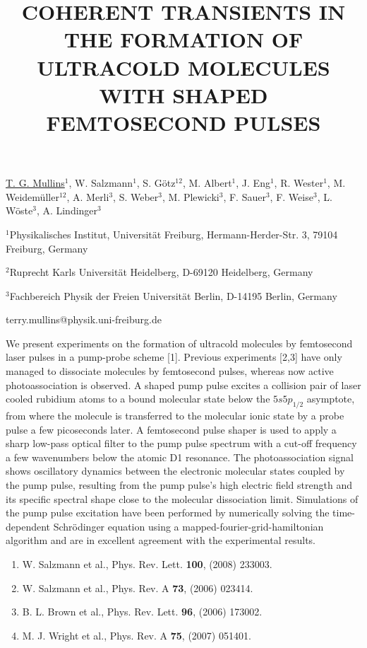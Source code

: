 \title{COHERENT TRANSIENTS IN THE FORMATION OF \mbox{ULTRACOLD} MOLECULES WITH SHAPED FEMTOSECOND PULSES}

\underline{T. G. Mullins}$^1$, W. Salzmann$^1$, S. G\"{o}tz$^{12}$,
M. Albert$^1$, J. Eng$^1$, R. Wester$^1$, M. Weidem\"{u}ller$^{12}$,
A. Merli$^3$, S. Weber$^3$, M. Plewicki$^3$, F. Sauer$^3$, F.
Weise$^3$, L. W\"{o}ste$^3$, A. Lindinger$^3$    

{\normalsize{\vspace{-4mm} $^1$Physikalisches Institut, Universit\"{a}t Freiburg,
Hermann-Herder-Str. 3, 79104 Freiburg, Germany

\vspace{-4mm} $^2$Ruprecht Karls Universit\"{a}t Heidelberg, D-69120 Heidelberg, Germany

\vspace{-4mm} $^3$Fachbereich Physik der Freien Universit\"{a}t
Berlin, D-14195 Berlin, Germany

\email terry.mullins@physik.uni-freiburg.de}}

We present experiments on the formation of ultracold molecules by
femtosecond laser pulses in a pump-probe scheme [1]. Previous
experiments [2,3] have only managed to dissociate molecules by
femtosecond pulses, whereas now active photoassociation is observed.
A shaped pump pulse excites a collision pair of laser cooled
rubidium atoms to a bound molecular state below the $5s5p_{1/2}$
asymptote, from where the molecule is transferred to the molecular
ionic state by a probe pulse a few picoseconds later. A femtosecond
pulse shaper is used to apply a sharp low-pass optical filter to the
pump pulse spectrum with a cut-off frequency a few wavenumbers below
the atomic D1 resonance. The photoassociation signal shows
oscillatory dynamics between the electronic molecular states coupled
by the pump pulse, resulting from the pump pulse's high electric
field strength and its specific spectral shape close to the
molecular dissociation limit. Simulations of the pump pulse
excitation have been performed by numerically solving the
time-dependent Schr\"{o}dinger equation using a
mapped-fourier-grid-hamiltonian algorithm and are in excellent
agreement with the experimental results.

\vspace{-4mm} {\normalsize \begin{enumerate}
\item W. Salzmann et al., Phys. Rev. Lett. \textbf{100}, (2008) 233003.
\item W. Salzmann et al., Phys. Rev. A \textbf{73}, (2006) 023414.
\item B. L. Brown et al., Phys. Rev. Lett. \textbf{96}, (2006) 173002.
\item M. J. Wright et al., Phys. Rev. A \textbf{75}, (2007) 051401.
\end{enumerate}
}

\vspace{\baselineskip}
